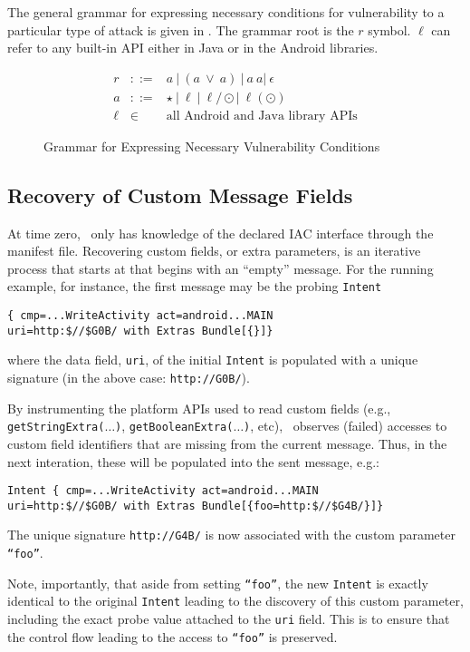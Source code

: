 The general grammar for expressing necessary conditions for vulnerability to a particular type of attack is given in . The grammar root is the $r$ symbol. $\ell$ can refer to any built-in API either in Java or in the Android libraries.

\begin{figure}
	$$
	\begin{array}{rcl}
		r & ::= &  a\ |\ (a\ \vee\ a)\ |\  a\ a |\ \epsilon  \\
		a & ::= & \star\ |\ \ell\ |\ \ell / \odot |\ \ell(\odot) \\
		\ell & \in & \text{all Android and Java library APIs}
	\end{array}
	$$
\caption{\label{Fi:grammar}Grammar for Expressing Necessary Vulnerability Conditions}
\end{figure}

\subsection{Recovery of Custom Message Fields}

At time zero, \Tool\ only has knowledge of the declared IAC interface through the manifest file. Recovering custom fields, or extra parameters, is an iterative process that starts at that begins with an ``empty'' message. For the running example, for instance, the first message may be the probing {\tt Intent}
\begin{lstlisting}[numbers=none]
{ cmp=...WriteActivity act=android...MAIN 
uri=http:$//$G0B/ with Extras Bundle[{}]}
\end{lstlisting}
where the data field, {\tt uri}, of the initial {\tt Intent} is populated with a unique signature (in the above case: {\tt http://G0B/}).

By instrumenting the platform APIs used to read custom fields (e.g., 
{\tt getStringExtra($\ldots$)}, {\tt getBooleanExtra($\ldots$)}, etc), \Tool\ observes (failed) accesses to custom field identifiers that are missing from the current message. Thus, in the next interation, these will be populated into the sent message, e.g.:
\begin{lstlisting}[numbers=none]
Intent { cmp=...WriteActivity act=android...MAIN 
uri=http:$//$G0B/ with Extras Bundle[{foo=http:$//$G4B/}]}
\end{lstlisting}
The unique signature {\tt http://G4B/} is now associated with the custom parameter {\tt ``foo''}. 

Note, importantly, that aside from setting {\tt ``foo''}, the new {\tt Intent} is exactly identical to the original {\tt Intent} leading to the discovery of this custom parameter, including the exact probe value attached to the {\tt uri} field. This is to ensure that the control flow leading to the access to {\tt ``foo''} is preserved.

